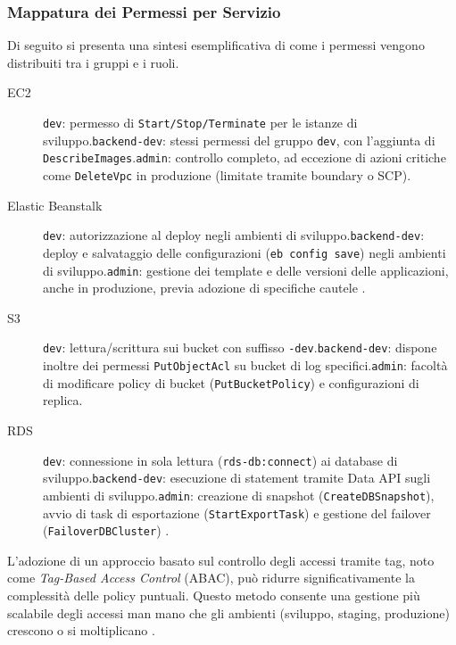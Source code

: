 \subsubsection{Mappatura dei Permessi per Servizio}
\label{subsubsec:mappa_servizi_iam}
Di seguito si presenta una sintesi esemplificativa di come i permessi vengono distribuiti tra i gruppi e i ruoli.
\begin{description}
  \item[EC2] \texttt{dev}: permesso di \texttt{Start/Stop/Terminate} per le istanze di sviluppo.\newline \texttt{backend-dev}: stessi permessi del gruppo \texttt{dev}, con l'aggiunta di \texttt{Describe\discretionary{-}{}{}Images}.\newline \texttt{admin}: controllo completo, ad eccezione di azioni critiche come \texttt{DeleteVpc} in produzione (limitate tramite boundary o SCP).
  \item[Elastic Beanstalk] \texttt{dev}: autorizzazione al deploy negli ambienti di sviluppo.\newline \texttt{backend-dev}: deploy e salvataggio delle configurazioni (\texttt{eb config save}) negli ambienti di sviluppo.\newline \texttt{admin}: gestione dei template e delle versioni delle applicazioni, anche in produzione, previa adozione di specifiche cautele \cite{AWSEBRole}.
  \item[S3] \texttt{dev}: lettura/scrittura sui bucket con suffisso \texttt{-dev}.\newline \texttt{backend-dev}: dispone inoltre dei permessi \texttt{PutObjectAcl} su bucket di log specifici.\newline \texttt{admin}: facoltà di modificare policy di bucket (\texttt{PutBucketPolicy}) e configurazioni di replica.
  \item[RDS] \texttt{dev}: connessione in sola lettura (\texttt{rds-db:connect}) ai database di sviluppo.\newline \texttt{backend-dev}: esecuzione di statement tramite Data API sugli ambienti di sviluppo.\newline \texttt{admin}: creazione di snapshot (\texttt{CreateDBSnapshot}), avvio di task di esportazione (\texttt{StartExportTask}) e gestione del failover (\texttt{FailoverDBCluster}) \cite{AWSRDSIAM}.
\end{description}
L'adozione di un approccio basato sul controllo degli accessi tramite tag, noto come \emph{Tag-Based Access Control} (ABAC), può ridurre significativamente la complessità delle policy puntuali. Questo metodo consente una gestione più scalabile degli accessi man mano che gli ambienti (sviluppo, staging, produzione) crescono o si moltiplicano \cite{AWSEC2IAM,AWSELBIAM}.

